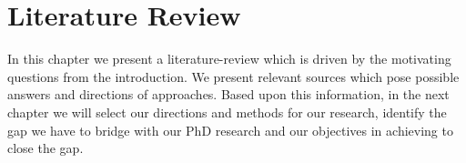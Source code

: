 \chapter{Literature Review}
\label{chap:literature}

In this chapter we present a literature-review which is driven by the motivating questions from the introduction. We present relevant sources which pose possible answers and directions of approaches. Based upon this information, in the next chapter we will select our directions and methods for our research, identify the gap we have to bridge with our PhD research and our objectives in achieving to close the gap.















